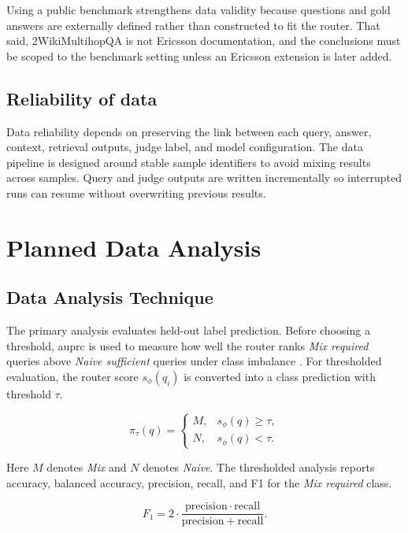 \documentclass[english, bibtex]{kththesis}               %
\numberwithin{listing}{chapter}
\begin{document}
Using a public benchmark strengthens data validity because questions and gold answers are externally defined rather than constructed to fit the router. That said, 2WikiMultihopQA is not Ericsson documentation, and the conclusions must be scoped to the benchmark setting unless an Ericsson extension is later added.

\subsection{Reliability of data}
\label{sec:reliabilityOfData}

Data reliability depends on preserving the link between each query, answer, context, retrieval outputs, judge label, and model configuration. The data pipeline is designed around stable sample identifiers to avoid mixing results across samples. Query and judge outputs are written incrementally so interrupted runs can resume without overwriting previous results.

\section{Planned Data Analysis}
\label{sec:plannedDataAnalysis}

\subsection{Data Analysis Technique}
\label{sec:dataAnalysisTechnique}

The primary analysis evaluates held-out label prediction. Before choosing a threshold, \gls{auprc} is used to measure how well the router ranks \emph{Mix required} queries above \emph{Naive sufficient} queries under class imbalance \cite{saito2015precision}. For thresholded evaluation, the router score \(s_\phi(q_i)\) is converted into a class prediction with threshold \(\tau\).

\begin{equation}
\label{eq:routingPolicy}
\pi_\tau(q)=
\begin{cases}
M, & s_\phi(q) \geq \tau,\\
N, & s_\phi(q) < \tau.
\end{cases}
\end{equation}

Here \(M\) denotes \emph{Mix} and \(N\) denotes \emph{Naive}. The thresholded analysis reports accuracy, balanced accuracy, precision, recall, and F1 for the \emph{Mix required} class.

\begin{equation}
\label{eq:f1}
F_1 =
2 \cdot
\frac{\mathrm{precision}\cdot\mathrm{recall}}
{\mathrm{precision}+\mathrm{recall}}.
\end{equation}
\end{document}
